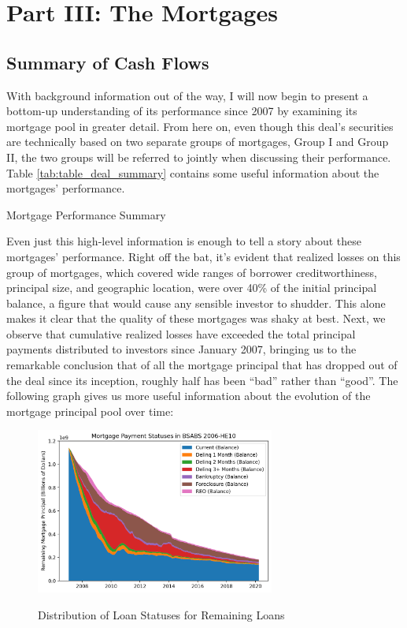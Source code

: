 \documentclass[12pt]{article}
\begin{document}
\section*{Part III: The Mortgages}
\subsection*{Summary of Cash Flows}

With background information out of the way, I will now begin to present a bottom-up understanding of its performance since 2007 by examining its mortgage pool in greater detail. From here on, even though this deal’s securities are technically based on two separate groups of mortgages, Group I and Group II, the two groups will be referred to jointly when discussing their performance. Table \ref{tab:table_deal_summary} contains some useful information about the mortgages’ performance.

\begin{table}[h]
	\centering
	
	\caption{Mortgage Performance Summary}
	\label{tab:table_deal_summary}
\end{table}

Even just this high-level information is enough to tell a story about these mortgages’ performance. Right off the bat, it's evident that realized losses on this group of mortgages, which covered wide ranges of borrower creditworthiness, principal size, and geographic location, were over 40\% of the initial principal balance, a figure that would cause any sensible investor to shudder. This alone makes it clear that the quality of these mortgages was shaky at best. Next, we observe that cumulative realized losses have exceeded the total principal payments distributed to investors since January 2007, bringing us to the remarkable conclusion that of all the mortgage principal that has dropped out of the deal since its inception, roughly half has been “bad” rather than “good”. The following graph gives us more useful information about the evolution of the mortgage principal pool over time:

\begin{figure}[h]
	\centering
	\caption{Distribution of Loan Statuses for Remaining Loans}
	\includegraphics[width=0.7\textwidth]{../figures/stackplot_delinq_status}
	\label{fig:stackplot_delinq_status}
\end{figure}
\end{document}
